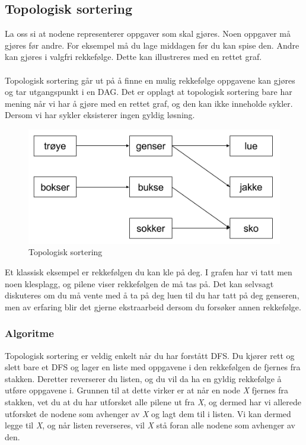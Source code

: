 \subsection{Topologisk sortering}
La oss si at nodene representerer oppgaver som skal gjøres. Noen oppgaver må gjøres før andre. For eksempel må du lage middagen før du kan spise den. Andre kan gjøres i valgfri rekkefølge. Dette kan illustreres med en rettet graf.
\\\\
Topologisk sortering går ut på å finne en mulig rekkefølge oppgavene kan gjøres og tar utgangspunkt i en DAG. Det er opplagt at topologisk sortering bare har mening når vi har å gjøre med en rettet graf, og den kan ikke inneholde sykler. Dersom vi har sykler eksisterer ingen gyldig løsning.

\begin{boxed}
\begin{figure}[H]
\includegraphics[scale=0.7]{images/topologisk}
\centering %
\caption{Topologisk sortering}
\label{fig:topologisk}
\end{figure}

Et klassisk eksempel er rekkefølgen du kan kle på deg. I grafen har vi tatt men noen klesplagg, og pilene viser rekkefølgen de må tas på. Det kan selvsagt diskuteres om du må vente med å ta på deg luen til du har tatt på deg genseren, men av erfaring blir det gjerne ekstraarbeid dersom du forsøker annen rekkefølge.
\end{boxed}

\subsubsection{Algoritme}
Topologisk sortering er veldig enkelt når du har forstått DFS. Du kjører rett og slett bare et DFS og lager en liste med oppgavene i den rekkefølgen de fjernes fra stakken. Deretter reverserer du listen, og du vil da ha en gyldig rekkefølge å utføre oppgavene i. Grunnen til at dette virker er at når en node \textit{X} fjernes fra stakken, vet du at du har utforsket alle pilene ut fra \textit{X}, og dermed har vi allerede utforsket de nodene som avhenger av \textit{X} og lagt dem til i listen. Vi kan dermed legge til \textit{X}, og når listen reverseres, vil \textit{X} stå foran alle nodene som avhenger av den.

